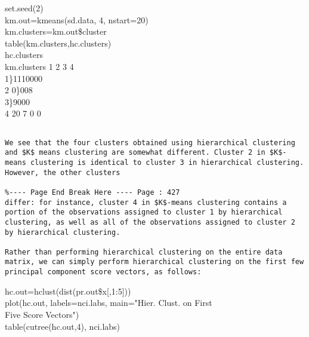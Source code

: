 \documentclass[10pt]{article}
\begin{document}
\begin{displayquote}
set.seed(2)\\
km.out=kmeans(sd.data, 4, nstart=20)\\
km.clusters=km.out\$cluster\\
table(km.clusters,hc.clusters)\\
hc.clusters\\
km.clusters 1 2 3 4\\
1\}1110000\\
2 0\}008\\
3\}9000\\
4 20 7 0 0
\end{displayquote}

\begin{verbatim}

We see that the four clusters obtained using hierarchical clustering and $K$ means clustering are somewhat different. Cluster 2 in $K$-means clustering is identical to cluster 3 in hierarchical clustering. However, the other clusters

%---- Page End Break Here ---- Page : 427
differ: for instance, cluster 4 in $K$-means clustering contains a portion of the observations assigned to cluster 1 by hierarchical clustering, as well as all of the observations assigned to cluster 2 by hierarchical clustering.

Rather than performing hierarchical clustering on the entire data matrix, we can simply perform hierarchical clustering on the first few principal component score vectors, as follows:
\end{verbatim}

\begin{displayquote}
hc.out=hclust(dist(pr.out\$x[,1:5]))\\
plot(hc.out, labels=nci.labs, main="Hier. Clust. on First\\
Five Score Vectors")\\
table(cutree(hc.out,4), nci.labs)
\end{displayquote}
\end{document}

